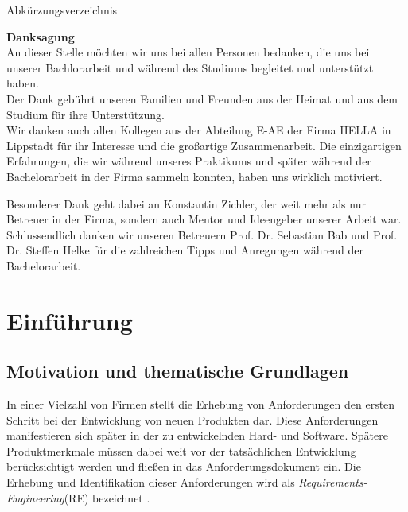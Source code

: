 \documentclass[12pt]{report}
\begin{document}
\newpage
\tableofcontents
\newpage
\listoffigures
\listoftables
\newpage

\thispagestyle{empty}
\begin{huge}
Abkürzungsverzeichnis
\end{huge}
\vspace{12pt}
\begin{acronym}[Abkürzungsverzeichnis]
\end{acronym}
\newpage

\thispagestyle{empty}
\textbf{Danksagung}
\vspace{12pt} \\
An dieser Stelle möchten wir uns bei allen Personen bedanken, die uns bei unserer Bachlorarbeit und während des Studiums begleitet und unterstützt haben.
\vspace{12pt} \\
Der Dank gebührt unseren Familien und Freunden aus der Heimat und aus dem Studium für ihre Unterstützung.
\vspace{12pt} \\
Wir danken auch allen Kollegen aus der Abteilung E-AE der Firma HELLA in Lippstadt für ihr Interesse und die großartige Zusammenarbeit. Die einzigartigen Erfahrungen, die wir während unseres Praktikums und später während der Bachelorarbeit in der Firma sammeln konnten, haben uns wirklich motiviert. 

Besonderer Dank geht dabei an Konstantin Zichler, der weit mehr als nur Betreuer in der Firma, sondern auch Mentor und Ideengeber unserer Arbeit war.
\vspace{12pt} \\
Schlussendlich danken wir unseren Betreuern Prof. Dr. Sebastian Bab und Prof. Dr. Steffen Helke für die zahlreichen Tipps und Anregungen während der Bachelorarbeit.
\newpage

\newpage
\chapter{Einführung}
\section[Motivation]{Motivation und thematische Grundlagen}
In einer Vielzahl von Firmen stellt die Erhebung von Anforderungen den ersten Schritt bei der Entwicklung von neuen Produkten dar. Diese Anforderungen manifestieren sich später in der zu entwickelnden Hard- und Software. Spätere Produktmerkmale müssen dabei weit vor der tatsächlichen Entwicklung berücksichtigt werden und fließen in das Anforderungsdokument ein. Die Erhebung und Identifikation dieser Anforderungen wird als \textit{Requirements-Engineering}(RE) bezeichnet \cite{bal10}.
\end{document}
